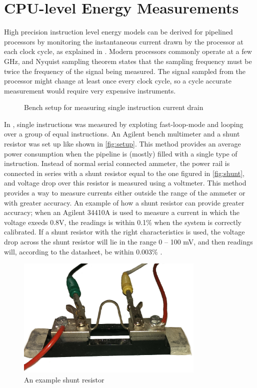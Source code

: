 \section{CPU-level Energy Measurements}
\label{sec:energymeasure}

High precision instruction level energy models can be derived for pipelined
processors by monitoring the instantaneous current drawn by the processor at
each clock cycle, as explained in \cite{nikolaidis2005instruction}. Modern
processors commonly operate at a few GHz, and Nyquist sampling theorem
\cite{nyquist1928certain} states that the sampling frequency must be twice the
frequency of the signal being measured. The signal sampled from the processor
might change at least once every clock cycle, so a cycle accurate measurement
would require very expensive instruments.

\begin{figure}[tbh]
    \centering
    
    \caption{Bench setup for measuring single instruction current drain}
    \label{fig:setup}
\end{figure}

In \cite{rundehvatum2013exploring}, single instructions was measured by
exploting fast-loop-mode and looping over a group of equal instructions. An
Agilent bench multimeter and a shunt resistor was set up like shown in
\autoref{fig:setup}. This method provides an average power consumption when the
pipeline is (mostly) filled with a single type of instruction. Instead of normal
serial connected ammeter, the power rail is connected in series with a shunt
resistor equal to the one figured in \autoref{fig:shunt}, and voltage drop over
this resistor is measured using a voltmeter. This method provides a way to
measure currents either outside the range of the ammeter or with greater
accuracy. An example of how a shunt resistor can provide greater accuracy; when
an Agilent 34410A is used to measure a current in which the voltage exeeds 0.8V,
the readings is within 0.1\% when the system is correctly calibrated. If a shunt
resistor with the right characteristics is used, the voltage drop across the
shunt resistor will lie in the range 0 -- 100 mV, and then readings will,
according to the datasheet, be within 0.003\% \cite{agilent34410a}.

\begin{figure}[tbh]
    \centering
    \includegraphics[width=0.8\textwidth]{figs/shunt.jpg}
    \caption{An example shunt resistor}
    \label{fig:shunt}
\end{figure}


